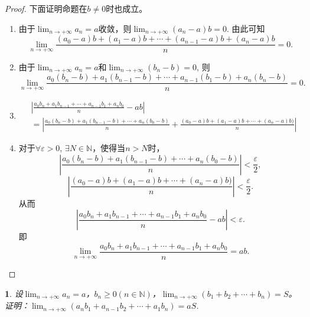 \documentclass[utf8]{book}
\newtheorem{example}{}[section]             %
\begin{document}
\begin{proof}
下面证明命题在$b\neq 0$时也成立。
\begin{enumerate}
\renewcommand\labelenumi{\normalfont(\theenumi)}
\item 由于$\displaystyle \lim_{n\to +\infty}a_n = a$收敛，则$\displaystyle \lim_{n\to +\infty}(a_n - a)b = 0$. 由此可知
$$\displaystyle \lim_{n\to +\infty}\frac{(a_0-a)b+(a_1-a)b+\cdots+(a_{n-1}-a)b+(a_n-a)b}{n}= 0.$$
\item 由于$\displaystyle \lim_{n\to +\infty}a_n = a$和$\displaystyle \lim_{n\to +\infty}(b_n - b) = 0$, 则
$$\displaystyle \lim_{n\to +\infty}\frac{a_0(b_n-b)+a_1(b_{n-1} - b)+\cdots+a_{n-1}(b_1 - b)+a_n(b_n-b)}{n}= 0.$$
\item 
\begin{equation*}
\begin{split}
&\left | \frac{a_0b_n+a_1b_{n-1}+\cdots+a_{n-1}b_1+a_nb_0}{n} - ab \right | \\
&= \left | \frac{a_0(b_n-b)+a_1(b_{n-1}-b)+\cdots+a_n(b_0-b)}{n} + \frac{(a_0-a)b+(a_1 - a)b+\cdots+(a_n-a)b)}{n}\right|
\end{split}
\end{equation*}
\item 对于$\forall \varepsilon > 0$, $\exists N \in \mathbb {N}$，使得当$n > N$时， 
$$\left | \frac{a_0(b_n-b)+a_1(b_{n-1}-b)+\cdots+a_n(b_0-b)}{n}\right| < \frac{\varepsilon}{2},$$
$$\left | \frac{(a_0-a)b+(a_1 - a)b+\cdots+(a_n-a)b)}{n}\right| < \frac{\varepsilon}{2}.$$
从而 $$\left | \frac{a_0b_n+a_1b_{n-1}+\cdots+a_{n-1}b_1+a_nb_0}{n} - ab \right | < \varepsilon.$$
即$$\displaystyle \lim_{n\to +\infty}\frac{a_0b_n+a_1b_{n-1}+\cdots+a_{n-1}b_1+a_nb_0}{n}= ab.$$
\end{enumerate}
\end{proof}
\begin{example}
设$\displaystyle \lim_{n\to +\infty}a_n = a$，$b_n \geq 0 (n\in\mathbb{N})$，$\displaystyle \lim_{n\to +\infty}(b_1+b_2+\cdots+b_n) = S$。证明：$\displaystyle \lim_{n\to +\infty}(a_nb_1+a_{n-1}b_2+\cdots+a_1b_n) = aS$.
\end{example}
\end{document}

